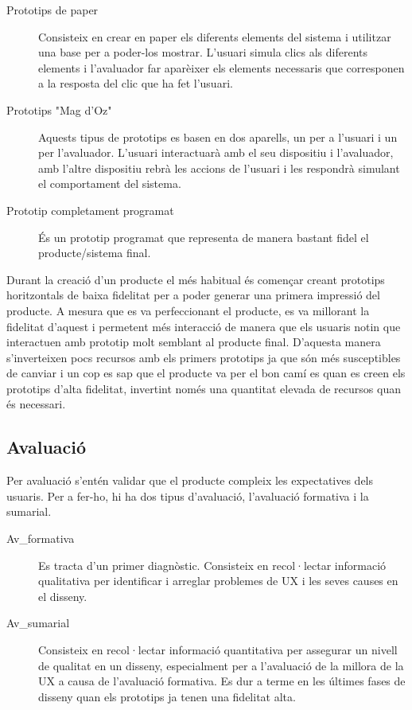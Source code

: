 \begin{description}
\item[Prototips de paper] Consisteix en crear en paper els diferents elements del sistema i utilitzar una base per a poder-los mostrar. L'usuari simula clics als diferents elements i l'avaluador far aparèixer els elements necessaris que corresponen a la resposta del clic que ha fet l'usuari. 
\item[Prototips "Mag d'Oz"] Aquests tipus de prototips es basen en dos aparells, un per a l'usuari i un per l'avaluador. L'usuari interactuarà amb el seu dispositiu i l'avaluador, amb l'altre dispositiu rebrà les accions de l'usuari i les respondrà simulant el comportament del sistema.
\item[Prototip completament programat] És un prototip programat que representa de manera bastant fidel el producte/sistema final.
\end{description}

Durant la creació d'un producte el més habitual és començar creant prototips horitzontals de baixa fidelitat per a poder generar una primera impressió del producte. A mesura que es va perfeccionant el producte, es va millorant la fidelitat d'aquest i permetent més interacció de manera que els usuaris notin que interactuen amb prototip molt semblant al producte final. D'aquesta manera s'inverteixen pocs recursos amb els primers prototips ja que són més susceptibles de canviar i un cop es sap que el producte va per el bon camí es quan es creen els prototips d'alta fidelitat, invertint només una quantitat elevada de recursos quan és necessari. 

\subsection{Avaluació}
Per avaluació s'entén validar que el producte compleix les expectatives dels usuaris. Per a fer-ho, hi ha dos tipus d'avaluació, l'avaluació formativa i la sumarial. 

\begin{description}
\item[\Gls{Av_formativa}] Es tracta d'un primer diagnòstic. Consisteix en recol·lectar informació qualitativa per identificar i arreglar problemes de \ac{UX} i les seves causes en el disseny.
\item[\Gls{Av_sumarial}] Consisteix en recol·lectar informació quantitativa per assegurar un nivell de qualitat en un disseny, especialment per a l'avaluació de la millora de la \ac{UX} a causa de l'avaluació formativa. Es dur a terme en les últimes fases de disseny quan els prototips ja tenen una fidelitat alta. 
\end{description}

